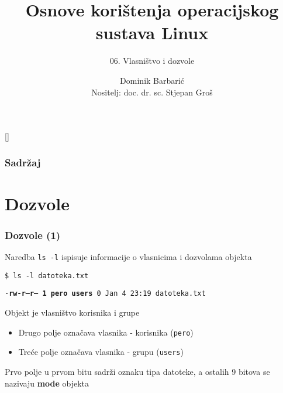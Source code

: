 \documentclass[table,usenames,dvipsnames]{beamer}
\title{Osnove korištenja operacijskog sustava Linux}
\subtitle{06. Vlasništvo i dozvole}
\author[Dominik Barbarić]{Dominik Barbarić\\{\small Nositelj: doc. dr. sc. Stjepan Groš}}
\institute[FER]{Sveučilište u Zagrebu \\
				Fakultet elektrotehnike i računarstva}
\date{\todayiso}
\newcommand{\shell}[1]{\texttt{#1}}
\begin{document}
{
[] %

\begin{frame}
\maketitle
\end{frame}
}

\begin{frame}
\frametitle{Sadržaj}
\tableofcontents
\end{frame}

\section{Dozvole}
\begin{frame}[t]
\frametitle{Dozvole (1)}
\begin{itemize}
	\item Naredba \shell{ls -l} ispisuje informacije o vlasnicima i dozvolama objekta
	{\small \item[] \shell{\$ ls -l datoteka.txt}
	\item[] \shell{-\textbf{rw-r--r-- 1 pero users} 0 Jan  4 23:19 datoteka.txt}}
	\vfill
    \item Objekt je vlasništvo korisnika i grupe
    \begin{itemize}
		\item Drugo polje označava vlasnika - korisnika \hfill (\shell{pero}) \hfill \,
		\item Treće polje označava vlasnika - grupu \hfill (\shell{users}) \hfill \,
    \end{itemize}
    \item Prvo polje u prvom bitu sadrži oznaku tipa datoteke, a ostalih 9 bitova se nazivaju \textbf{mode} objekta
  \end{itemize}
\end{frame}
\end{document}
